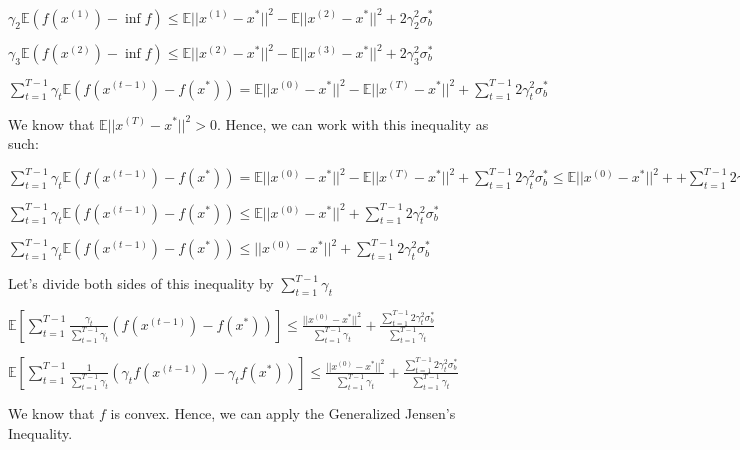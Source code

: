 $\gamma_2 \mathbb{E} (f(x^{(1)}) - \inf f) \leq \mathbb{E} ||x^{(1)} - x^*||^2 - \mathbb{E}||x^{(2)} - x^*||^2 + 2\gamma_2^2 \sigma_b^* $ \newline 

$\gamma_3 \mathbb{E} (f(x^{(2)}) - \inf f) \leq \mathbb{E} ||x^{(2)} - x^*||^2 - \mathbb{E}||x^{(3)} - x^*||^2 + 2\gamma_3^2 \sigma_b^* $ \newline 

$\sum_{t=1}^{T - 1} \gamma_t \mathbb{E} (f(x^{(t - 1)}) - f(x^*)) = \mathbb{E} ||x^{(0)} - x^*||^2 - \mathbb{E}||x^{(T)} - x^*||^2 +  \sum_{t=1}^{T - 1} 2 \gamma_t^2 \sigma_b^*$

We know that $\mathbb{E}||x^{(T)} - x^*||^2 > 0$. Hence, we can work with this inequality as such: \newline 

$\sum_{t=1}^{T - 1} \gamma_t \mathbb{E} (f(x^{(t - 1)}) - f(x^*)) = \mathbb{E} ||x^{(0)} - x^*||^2 - \mathbb{E}||x^{(T)} - x^*||^2 +  \sum_{t=1}^{T - 1} 2 \gamma_t^2 \sigma_b^* \leq \mathbb{E} ||x^{(0)} - x^*||^2 + +  \sum_{t=1}^{T - 1} 2 \gamma_t^2 \sigma_b^*$ \newline 

$\sum_{t=1}^{T - 1} \gamma_t \mathbb{E} (f(x^{(t - 1)}) - f(x^*)) \leq \mathbb{E} ||x^{(0)} - x^*||^2 + \sum_{t=1}^{T - 1} 2 \gamma_t^2 \sigma_b^*$ \newline 

$\sum_{t=1}^{T - 1} \gamma_t \mathbb{E} (f(x^{(t - 1)}) - f(x^*)) \leq  ||x^{(0)} - x^*||^2 +  \sum_{t=1}^{T - 1} 2 \gamma_t^2 \sigma_b^*$ \newline 

Let's divide both sides of this inequality by $\sum_{t = 1}^{T - 1} \gamma_t$ \newline 


$\mathbb{E} [\sum_{t=1}^{T - 1} \frac{\gamma_t}{\sum_{t = 1}^{T - 1} \gamma_t}  (f(x^{(t - 1)}) - f(x^*))] \leq \frac{||x^{(0)} - x^*||^2}{\sum_{t = 1}^{T - 1} \gamma_t} + \frac{\sum_{t=1}^{T - 1} 2 \gamma_t^2 \sigma_b^*}{\sum_{t = 1}^{T - 1} \gamma_t}$ \newline 

$\mathbb{E} [\sum_{t=1}^{T - 1} \frac{1}{\sum_{t = 1}^{T - 1} \gamma_t}  (\gamma_t f(x^{(t - 1)}) - \gamma_t f(x^*))] \leq \frac{||x^{(0)} - x^*||^2}{\sum_{t = 1}^{T - 1} \gamma_t} + \frac{\sum_{t=1}^{T - 1} 2 \gamma_t^2 \sigma_b^*}{\sum_{t = 1}^{T - 1} \gamma_t}$ \newline 


We know that $f$ is convex. Hence, we can apply the Generalized Jensen's Inequality. 

